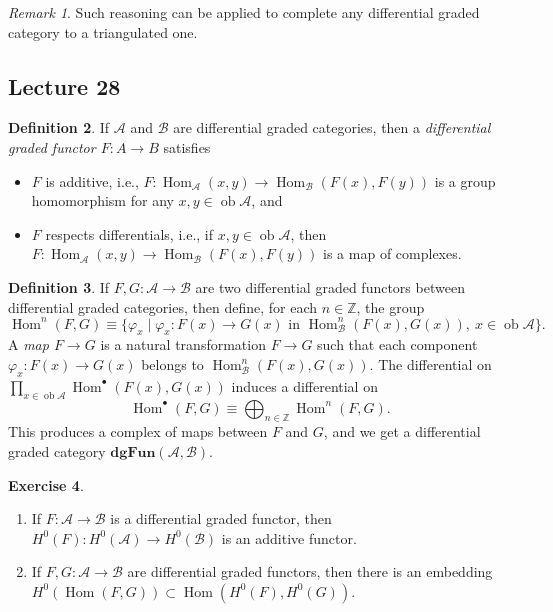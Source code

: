 \documentclass[10pt,letterpaper,cm]{nupset}
\theoremstyle{definition}
\newtheorem{definition}{Definition}[subsection]
\theoremstyle{theorem}
\newtheorem{exercise}[definition]{Exercise}
\theoremstyle{remark}
\newtheorem{remark}[definition]{Remark}
\newcommand{\Z}{\mathbb Z}
\newcommand{\1}{\mathbf{1}}
\renewcommand{\a}{\mathscr{A}}
\renewcommand{\b}{\mathscr{B}}
\newcommand{\0}{\vec 0}
\DeclareMathOperator{\ob}{ob}
\DeclareMathOperator{\Hom}{Hom}
\begin{document}
\begin{remark}
Such reasoning can be applied to complete any differential graded category to a triangulated one.
\end{remark}

\subsection{Lecture 28}

\begin{definition}
If $\a$ and $\b$ are differential graded categories, then a \textit{differential graded functor $F: A \to B$} satisfies
\begin{itemize}
\item $F$ is additive, i.e., $F : \Hom_{\a}(x,y) \to \Hom_{\b}(F(x), F(y))$ is a group homomorphism for any $x,y \in \ob{\a}$, and
\item $F$ respects differentials, i.e., if $x,y \in \ob{\a}$, then $F : \Hom_{\a}(x,y) \to \Hom_{\b}(F(x), F(y))$ is a map of complexes.
\end{itemize}
\end{definition}

\begin{definition}
If $F, G : \a \to \b$ are two differential graded functors between differential graded categories, then define, for each $n \in \Z$, the group $$\Hom^n(F, G) \equiv \{\varphi_x \mid \varphi_x : F(x) \to G(x) \text{ in } \Hom_{\b}^n(F(x), G(x)), \ x \in \ob{\a} \}.$$ A \textit{map $F \to G$} is a natural transformation $F\to G$ such that each component $\varphi_x: F(x) \to G(x)$ belongs to $\Hom^n_{\b}(F(x), G(x))$. The differential on $\prod_{x \in \ob{\a}} \Hom^{\bullet}(F(x), G(x))$ induces a differential on $$\Hom^{\bullet}(F, G) \equiv \bigoplus_{n \in \Z}\Hom^n(F,G).$$ This produces a complex of maps between $F$ and $G$, and we get a differential graded category $\mathbf{dgFun}(\a, \b)$.
\end{definition}

\begin{exercise} $ $
\begin{enumerate}
\item If $F : \a \to \b$ is a differential graded functor, then $H^0(F) : H^0(\a) \to H^0(\b)$ is an additive functor.
\item If $F, G : \a \to \b$ are differential graded functors, then there is an embedding $H^0(\Hom(F, G)) \subset \Hom(H^0(F), H^0(G))$.
\end{enumerate}
\end{exercise}
\end{document}
